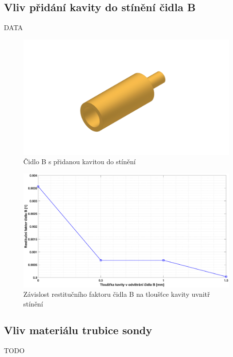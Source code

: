     \subsection{Vliv přidání kavity do stínění čidla B}
        DATA
        
        \begin{figure}[ht!]
            \centering
            \includegraphics[width=\textwidth]{400_SIMULACE_KONSTRUKCNICH_UPRAV/Vykresy_rendery/Kavita_B.png}
            \caption{Čidlo B s přidanou kavitou do stínění}
            \label{fig:kavita-B}
        \end{figure}
    
        \begin{figure}[ht!]
            \centering
            \includegraphics*[width=\textwidth, trim={5.25cm 1.0cm 5.8cm 2.0cm}]{400_SIMULACE_KONSTRUKCNICH_UPRAV/Grafy/kavita_B.eps}
            \caption{Závislost restitučního faktoru čidla B na tloušťce kavity uvnitř stínění}
            \label{fig:kavita-B-graf}
        \end{figure}
    
    \newpage
    \subsection{Vliv materiálu trubice sondy}
        TODO
    